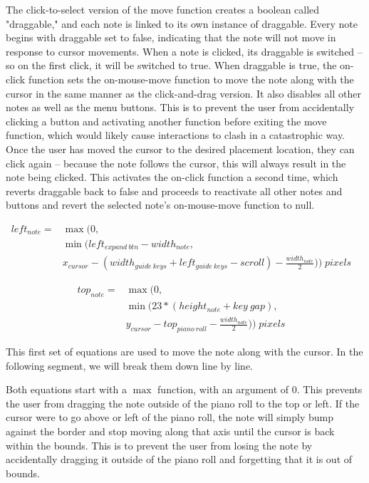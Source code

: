 The click-to-select version of the move function creates a boolean called "draggable," and each
note is linked to its own instance of draggable. Every note begins with draggable set to false,
indicating that the note will not move in response to cursor movements. When a note is clicked, its
draggable is switched – so on the first click, it will be switched to true. When draggable is true,
the on-click function sets the on-mouse-move function to move the note along with the cursor in the
same manner as the click-and-drag version. It also disables all other notes as well as the menu
buttons. This is to prevent the user from accidentally clicking a button and activating another
function before exiting the move function, which would likely cause interactions to clash in a
catastrophic way. Once the user has moved the cursor to the desired placement location, they can
click again – because the note follows the cursor, this will always result in the note being
clicked. This activates the on-click function a second time, which reverts draggable back to false
and proceeds to reactivate all other notes and buttons and revert the selected note’s on-mouse-move
function to null.

\begin{align} \label{move_horz}
  left_{note} = & \max(0,                                                                                                \\
                & \min(left_{expand\:btn} - width_{note},                                                                \\
                & x_{cursor} - (width_{guide\:keys} + left_{guide\:keys} - scroll) - \frac{width_{note}}{2})) \;pixels &
\end{align}

\begin{align} \label{move_vert}
  top_{note} = & \max(0,                                                              \\
               & \min(23 * (height_{note} + key\:gap),                                \\
               & y_{cursor} - top_{piano\:roll} - \frac{width_{note}}{2})) \;pixels &
\end{align}

This first set of equations are used to move the note along with the cursor. In the following
segment, we will break them down line by line.

Both equations start with a $ \max $ function, with an argument of $ 0 $. This prevents the user from
dragging the note outside of the piano roll to the top or left. If the cursor were to go above or
left of the piano roll, the note will simply bump against the border and stop moving along that
axis until the cursor is back within the bounds. This is to prevent the user from losing the note
by accidentally dragging it outside of the piano roll and forgetting that it is out of bounds.

